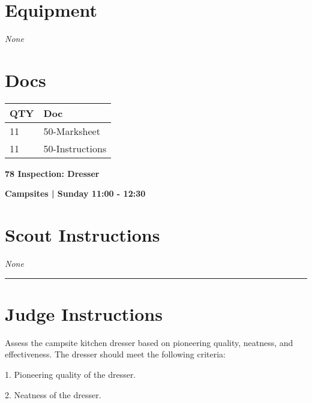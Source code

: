 \documentclass[10pt]{article}
\newcommand{\newtitle}[1]{\begin{center}{\Huge\bfseries #1 }\\ \vspace{5mm}\end{center}}
\newcommand{\newsubtitle}[1]{\begin{center}{\color{grey}\Large\bfseries #1 }\\ \vspace{5mm}\end{center}}
\begin{document}
	\begin{multicols}{2}

		\section*{\faWrench \: Equipment}

				\textit{None}
		
		\vfill\null
		\columnbreak

			\section*{\faFile \: Docs}
		 	\begin{center}
			\begin{tabular}{p{2cm}p{4cm}}

			\textbf{QTY} & \textbf{Doc} \\\toprule
										11&50-Marksheet\\\midrule
										11&50-Instructions\\\midrule
							\end{tabular}
			\end{center}
	

		\vfill\null

		\end{multicols}



	\vspace{1cm}


	\clearpage
		\newtitle{78 Inspection: Dresser }
	\newsubtitle{Campsites | Sunday 11:00 - 12:30}
		\setcounter{section}{77}
	\section*{Scout Instructions}
		\textit{None}
	
	\vspace{0.5cm}
	\hrule
	\vspace{0.5cm}

		\section*{Judge Instructions}
		Assess the campsite kitchen dresser based on pioneering quality, neatness, and effectiveness. The dresser should meet the following criteria:



1. Pioneering quality of the dresser.

2. Neatness of the dresser.
\end{document}
